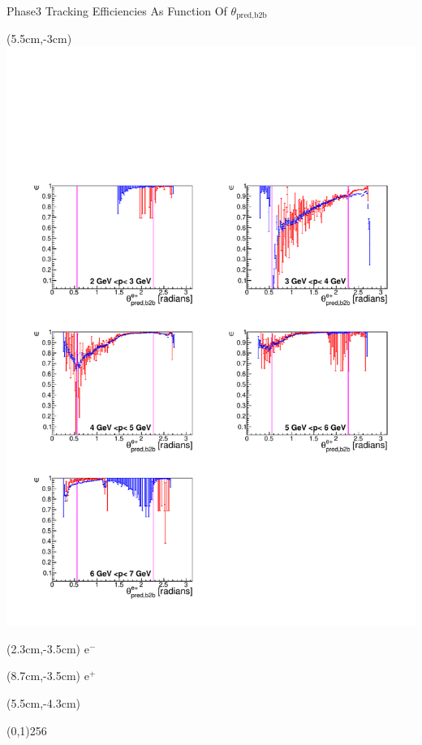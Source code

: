\documentclass[8pt]{beamer}
\begin{document}
\begin{frame}{Phase3 Tracking Efficiencies As Function Of $\theta_{\textrm{pred,b2b}}$}
	\begin{textblock*}{6.5cm}(5.5cm,-3cm)
		\includegraphics[width=\textwidth]{VPlots/P3/xPMThetaepP3}
	\end{textblock*}
	
	
	\begin{textblock*}{2cm}(2.3cm,-3.5cm)
		$\textrm{e}^-$
	\end{textblock*}
	
	\begin{textblock*}{2cm}(8.7cm,-3.5cm)
		$\textrm{e}^+$
	\end{textblock*}
	
	
	
	\begin{textblock*}{11cm}(5.5cm,-4.3cm)
		
		\begin{center}
			\line(0,1){256}
		\end{center}
		

\end{textblock*}
\end{frame}
\end{document}
